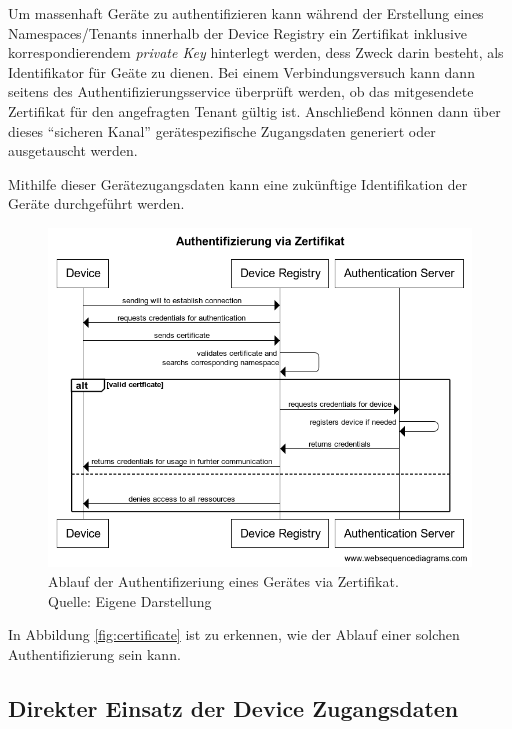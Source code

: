 Um massenhaft Geräte zu authentifizieren kann während der Erstellung eines Namespaces/Tenants innerhalb der Device Registry ein Zertifikat inklusive korrespondierendem \textit{private Key} hinterlegt werden, dess Zweck darin besteht, als Identifikator für Geäte zu dienen. Bei einem Verbindungsversuch kann dann seitens des Authentifizierungsservice überprüft werden, ob das mitgesendete Zertifikat für den angefragten Tenant gültig ist. Anschließend können dann über dieses \enquote{sicheren Kanal} gerätespezifische Zugangsdaten generiert oder ausgetauscht werden.

Mithilfe dieser Gerätezugangsdaten kann eine zukünftige Identifikation der Geräte durchgeführt werden.

\begin{figure}[h]
    \centering
    \includegraphics[width=1.0\linewidth]{img/device_authentication.png}
    \caption[Ablauf der Authentifizierung via Zertifikat]{Ablauf der Authentifizeriung eines Gerätes via Zertifikat.\\ Quelle: Eigene Darstellung}
    \label{fig:certificate}
\end{figure}

In Abbildung \vref{fig:certificate} ist zu erkennen, wie der Ablauf einer solchen Authentifizierung sein kann.

\subsection{Direkter Einsatz der Device Zugangsdaten}
\label{sec:credentials}

